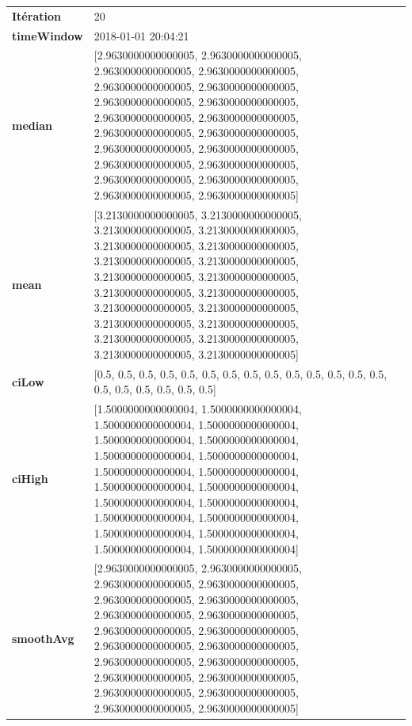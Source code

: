 \begin{table}[H]
	\centering
	\begin{tabularx}{\textwidth}{lX}
		\textbf{Itération}& 20\\
		\textbf{timeWindow} &2018-01-01 20:04:21 \\
		
		\textbf{median} &[2.9630000000000005, 2.9630000000000005, 2.9630000000000005, 2.9630000000000005, 2.9630000000000005, 2.9630000000000005, 2.9630000000000005, 2.9630000000000005, 2.9630000000000005, 2.9630000000000005, 2.9630000000000005, 2.9630000000000005, 2.9630000000000005, 2.9630000000000005, 2.9630000000000005, 2.9630000000000005, 2.9630000000000005, 2.9630000000000005, 2.9630000000000005, 2.9630000000000005]\\ 
		\textbf{mean} & [3.2130000000000005, 3.2130000000000005, 3.2130000000000005, 3.2130000000000005, 3.2130000000000005, 3.2130000000000005, 3.2130000000000005, 3.2130000000000005, 3.2130000000000005, 3.2130000000000005, 3.2130000000000005, 3.2130000000000005, 3.2130000000000005, 3.2130000000000005, 3.2130000000000005, 3.2130000000000005, 3.2130000000000005, 3.2130000000000005, 3.2130000000000005, 3.2130000000000005]\\ 
		\textbf{ciLow}& [0.5, 0.5, 0.5, 0.5, 0.5, 0.5, 0.5, 0.5, 0.5, 0.5, 0.5, 0.5, 0.5, 0.5, 0.5, 0.5, 0.5, 0.5, 0.5, 0.5]\\ 
		\textbf{ciHigh}& [1.5000000000000004, 1.5000000000000004, 1.5000000000000004, 1.5000000000000004, 1.5000000000000004, 1.5000000000000004, 1.5000000000000004, 1.5000000000000004, 1.5000000000000004, 1.5000000000000004, 1.5000000000000004, 1.5000000000000004, 1.5000000000000004, 1.5000000000000004, 1.5000000000000004, 1.5000000000000004, 1.5000000000000004, 1.5000000000000004, 1.5000000000000004, 1.5000000000000004]\\ 
		\textbf{smoothAvg}&  [2.9630000000000005, 2.9630000000000005, 2.9630000000000005, 2.9630000000000005, 2.9630000000000005, 2.9630000000000005, 2.9630000000000005, 2.9630000000000005, 2.9630000000000005, 2.9630000000000005, 2.9630000000000005, 2.9630000000000005, 2.9630000000000005, 2.9630000000000005, 2.9630000000000005, 2.9630000000000005, 2.9630000000000005, 2.9630000000000005, 2.9630000000000005, 2.9630000000000005]\\
			\end{tabularx} 
		\end{table}
		
